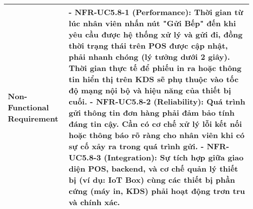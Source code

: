 \begin{longtable}{|m{4cm}|p{11cm}|}
Non-Functional Requirement & - \textbf{NFR-UC5.8-1 (Performance):} Thời gian từ lúc nhân viên nhấn nút "Gửi Bếp" đến khi yêu cầu được hệ thống xử lý và gửi đi, đồng thời trạng thái trên POS được cập nhật, phải nhanh chóng (lý tưởng dưới 2 giây). Thời gian thực tế để phiếu in ra hoặc thông tin hiển thị trên KDS sẽ phụ thuộc vào tốc độ mạng nội bộ và hiệu năng của thiết bị cuối. \newline - \textbf{NFR-UC5.8-2 (Reliability):} Quá trình gửi thông tin đơn hàng phải đảm bảo tính đáng tin cậy. Cần có cơ chế xử lý lỗi kết nối hoặc thông báo rõ ràng cho nhân viên khi có sự cố xảy ra trong quá trình gửi. \newline - \textbf{NFR-UC5.8-3 (Integration):} Sự tích hợp giữa giao diện POS, backend, và cơ chế quản lý thiết bị (ví dụ: IoT Box) cùng các thiết bị phần cứng (máy in, KDS) phải hoạt động trơn tru và chính xác. \\
\hline
\end{longtable}

